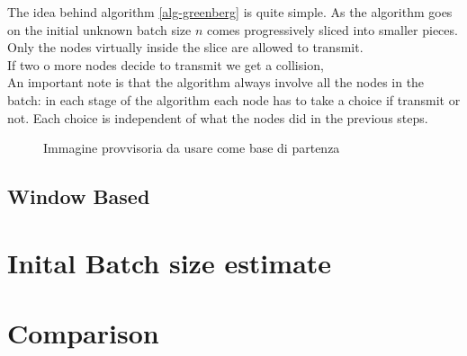 \documentclass[12pt,a4paper]{report}
\begin{document}
The idea behind algorithm \ref{alg-greenberg} is quite simple. As the algorithm goes on the initial unknown batch size $n$
comes progressively sliced into smaller pieces. Only the nodes virtually inside the slice are allowed to transmit.\\
If two o more nodes decide to transmit we get a collision,\\
An important note is that the algorithm always involve all the nodes in the batch: in each stage of the algorithm each node has to take a choice if transmit or not. 
Each choice is independent of what the nodes did in the previous steps. 



\begin{figure}[t]
    
    \caption[Idealised directional spectrum]{Immagine provvisoria da usare come base di partenza}
    \label{fig:sp2d}
\end{figure}

\section{Window Based}
\chapter{Inital Batch size estimate}
\chapter{Comparison}


\end{document}
